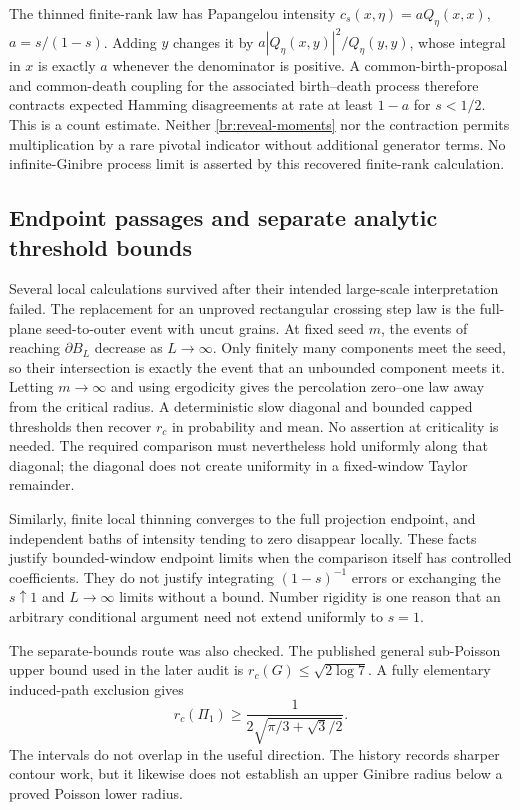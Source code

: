 \documentclass[11pt,a4paper]{article}
\theoremstyle{definition}
\theoremstyle{remark}
\numberwithin{equation}{section}
\begin{document}
The thinned finite-rank law has Papangelou intensity
$c_s(x,\eta)=aQ_\eta(x,x)$, $a=s/(1-s)$. Adding $y$ changes it by
$a|Q_\eta(x,y)|^2/Q_\eta(y,y)$, whose integral in $x$ is exactly
$a$ whenever the denominator is positive.
A common-birth-proposal and common-death coupling for the associated
birth--death process therefore contracts expected Hamming
disagreements at rate at least $1-a$ for $s<1/2$.
This is a count estimate. Neither \eqref{br:reveal-moments} nor
the contraction permits multiplication by a rare pivotal indicator
without additional generator terms. No infinite-Ginibre process
limit is asserted by this recovered finite-rank calculation.

\subsection{Endpoint passages and separate analytic threshold bounds}
\label{br:endpoints}

Several local calculations survived after their intended large-scale
interpretation failed.  The replacement for an unproved rectangular
crossing step law is the full-plane seed-to-outer event with uncut
grains.  At fixed seed $m$, the events of reaching $\partial B_L$
decrease as $L\to\infty$.  Only finitely many components meet the seed,
so their intersection is exactly the event that an unbounded component
meets it.  Letting $m\to\infty$ and using ergodicity gives the
percolation zero--one law away from the critical radius.  A deterministic
slow diagonal and bounded capped thresholds then recover $r_c$ in
probability and mean.  No assertion at criticality is needed.  The
required comparison must nevertheless hold uniformly along that
diagonal; the diagonal does not create uniformity in a fixed-window
Taylor remainder.

Similarly, finite local thinning converges to the full projection
endpoint, and independent baths of intensity tending to zero disappear
locally.  These facts justify bounded-window endpoint limits when the
comparison itself has controlled coefficients.  They do not justify
integrating $(1-s)^{-1}$ errors or exchanging the $s\uparrow1$ and
$L\to\infty$ limits without a bound.  Number rigidity is one reason
that an arbitrary conditional argument need not extend uniformly to
$s=1$.

The separate-bounds route was also checked.  The published general
sub-Poisson upper bound used in the later audit is
$r_c(G)\leq\sqrt{2\log7}$.  A fully elementary induced-path exclusion
gives
\[
 r_c(\Pi_1)\geq
 \frac{1}{2\sqrt{\pi/3+\sqrt3/2}}.
\]
The intervals do not overlap in the useful direction.  The history
records sharper contour work, but it likewise does not establish an
upper Ginibre radius below a proved Poisson lower radius.
\end{document}
